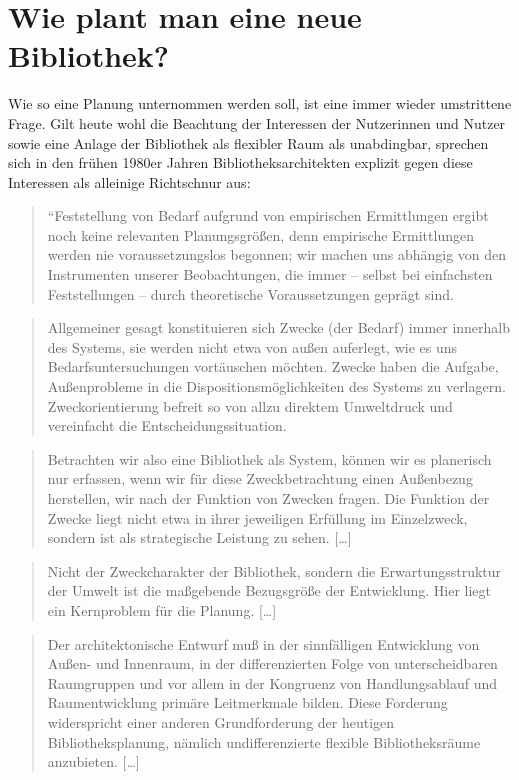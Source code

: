 \documentclass[a4paper,
fontsize=11pt,
oneside,
numbers=noperiodatend,
parskip=half-,
bibliography=totoc,
final
]{scrartcl}
\begin{document}
\section*{Wie plant man eine neue
Bibliothek?}\label{wie-plant-man-eine-neue-bibliothek}

Wie so eine Planung unternommen werden soll, ist eine immer wieder
umstrittene Frage. Gilt heute wohl die Beachtung der Interessen der
Nutzerinnen und Nutzer sowie eine Anlage der Bibliothek als flexibler
Raum als unabdingbar, sprechen sich in den frühen 1980er Jahren
Bibliotheksarchitekten explizit gegen diese Interessen als alleinige
Richtschnur aus:

\begin{quote}
``Feststellung von Bedarf aufgrund von empirischen Ermittlungen ergibt
noch keine relevanten Planungsgrößen, denn empirische Ermittlungen
werden nie voraussetzungslos begonnen; wir machen uns abhängig von den
Instrumenten unserer Beobachtungen, die immer -- selbst bei einfachsten
Feststellungen -- durch theoretische Voraussetzungen geprägt sind.
\end{quote}

\begin{quote}
Allgemeiner gesagt konstituieren sich Zwecke (der Bedarf) immer
innerhalb des Systems, sie werden nicht etwa von außen auferlegt, wie es
uns Bedarfsuntersuchungen vortäuschen möchten. Zwecke haben die Aufgabe,
Außenprobleme in die Dispositionsmöglichkeiten des Systems zu verlagern.
Zweckorientierung befreit so von allzu direktem Umweltdruck und
vereinfacht die Entscheidungssituation.
\end{quote}

\begin{quote}
Betrachten wir also eine Bibliothek als System, können wir es planerisch
nur erfassen, wenn wir für diese Zweckbetrachtung einen Außenbezug
herstellen, wir nach der Funktion von Zwecken fragen. Die Funktion der
Zwecke liegt nicht etwa in ihrer jeweiligen Erfüllung im Einzelzweck,
sondern ist als strategische Leistung zu sehen. {[}\ldots{}{]}
\end{quote}

\begin{quote}
Nicht der Zweckcharakter der Bibliothek, sondern die Erwartungsstruktur
der Umwelt ist die maßgebende Bezugsgröße der Entwicklung. Hier liegt
ein Kernproblem für die Planung. {[}\ldots{}{]}
\end{quote}

\begin{quote}
Der architektonische Entwurf muß in der sinnfälligen Entwicklung von
Außen- und Innenraum, in der differenzierten Folge von unterscheidbaren
Raumgruppen und vor allem in der Kongruenz von Handlungsablauf und
Raumentwicklung primäre Leitmerkmale bilden. Diese Forderung
widerspricht einer anderen Grundforderung der heutigen
Bibliotheksplanung, nämlich undifferenzierte flexible Bibliotheksräume
anzubieten. {[}\ldots{}{]}
\end{quote}
\end{document}
